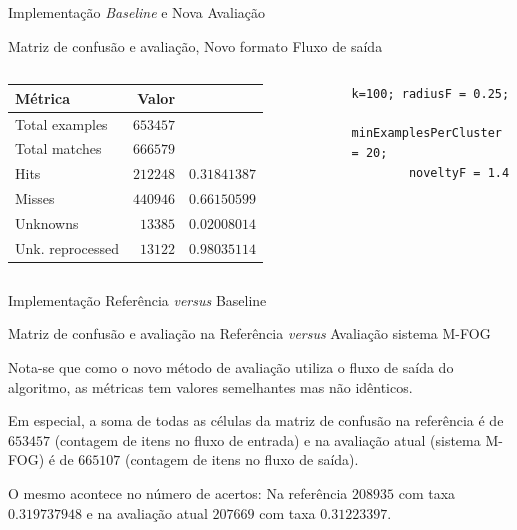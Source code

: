 \documentclass[aspectratio=43,10pt]{beamer}
\newcommand{\mfog}{sistema M-FOG\xspace}
\begin{document}
\begin{frame}[fragile]{Implementação \textit{Baseline} e Nova Avaliação}
\begin{alertblock}{Matriz de confusão e avaliação, Novo formato Fluxo de saída}
\begin{columns}[T,onlytextwidth]
      \footnotesize{
      \begin{tabular}
        { l                     | r                 r             }
        \textbf{Métrica}        & \textbf{Valor}  &               \\ \hline
        \hline Total examples   & $653457$        &               \\
        \hline Total matches    & $666579$        &               \\
        \hline Hits             & $212248$        & $0.31841387$  \\
        \hline Misses           & $440946$        & $0.66150599$  \\
        \hline Unknowns         & $13385$         & $0.02008014$  \\
        \hline Unk. reprocessed & $13122$         & $0.98035114$  \\
      \end{tabular}
      }

      \begin{Verbatim}[fontsize=\small]
        k=100; radiusF = 0.25;
        minExamplesPerCluster = 20;
        noveltyF = 1.4
      \end{Verbatim}

    \end{columns}
  \end{alertblock}
\end{frame}


\begin{frame}[fragile]{Implementação Referência \textit{versus} Baseline}
  \begin{alertblock}{Matriz de confusão e avaliação na Referência \textit{versus} Avaliação \mfog}
    \hspace{0.5em}

    Nota-se que como o novo método de avaliação utiliza o fluxo de saída do algoritmo,
    as métricas tem valores semelhantes mas não idênticos.
    
    Em especial, a soma de todas as células da matriz de confusão na referência é de $653457$
    (contagem de itens no fluxo de entrada)
    e na avaliação atual (\mfog) é de $665107$ (contagem de itens no fluxo de saída).
    
    O mesmo acontece no número de acertos:
    Na referência $208935$ com taxa $0.319737948$ e na avaliação atual
    $207669$ com taxa $0.31223397$.

  \end{alertblock}
\end{frame}
\end{document}
